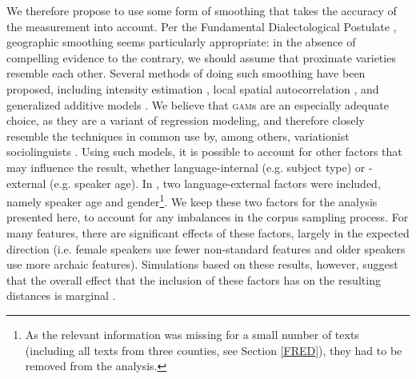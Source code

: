 \documentclass[output=paper]{LSP/langsci}
\begin{document}
We therefore propose to use some form of smoothing that takes the accuracy of the measurement into account.
Per the Fundamental Dialectological Postulate \citep{nerbonne_toward_2007}, geographic smoothing seems particularly appropriate: in the absence of compelling evidence to the contrary, we should assume that proximate varieties resemble each other.
Several methods of doing such smoothing have been proposed, including intensity estimation \citep{rumpf_structural_2009}, local spatial autocorrelation \citep{grieve_corpus-based_2009}, and generalized additive models \citep[\textsc{gam}s;][]{wieling_quantitative_2012}.
We believe that \textsc{gam}s are an especially adequate choice, as they are a variant of regression modeling, and therefore closely resemble the techniques in common use by, among others, variationist sociolinguists \citep{tagliamonte_variationist_2012}.
Using such models, it is possible to account for other factors that may influence the result, whether language-internal (e.g. subject type) or -external (e.g. speaker age).
In \citet{wolk_integrating_2014}, two language-external factors were included, namely speaker age and gender\footnote{As the relevant information was missing for a small number of texts (including all texts from three counties, see Section \ref{FRED}), they had to be removed from the analysis.}.
We keep these two factors for the analysis presented here, to account for any imbalances in the corpus sampling process.
For many features, there are significant effects of these factors, largely in the expected direction (i.e. female speakers use fewer non-standard features and older speakers use more archaic features).
Simulations based on these results, however, suggest that the overall effect that the inclusion of these factors has on the resulting distances is marginal \citep[233f.]{wolk_integrating_2014}.
\end{document}
